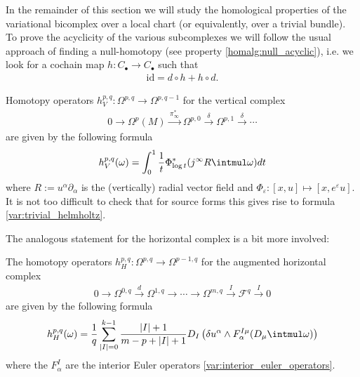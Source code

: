     In the remainder of this section we will study the homological properties of the variational bicomplex over a local chart (or equivalently, over a trivial bundle). To prove the acyclicity of the various subcomplexes we will follow the usual approach of finding a null-homotopy (see property \ref{homalg:null_acyclic}), i.e. we look for a cochain map $h:C_\bullet\rightarrow C_\bullet$ such that
    \begin{gather}
        \text{id} = d\circ h + h\circ d.
    \end{gather}

    \begin{property}
        Homotopy operators $h^{p,q}_V:\Omega^{p,q}\rightarrow\Omega^{p,q-1}$ for the vertical complex
        \begin{gather}
            0\longrightarrow\Omega^p(M)\xrightarrow{\,\pi_\infty^*\,}\Omega^{p,0}\xrightarrow{\ \delta\ }\Omega^{p,1}\xrightarrow{\ \delta\ }\cdots
        \end{gather}
        are given by the following formula
        \begin{gather}
            h^{p,q}_V(\omega) = \int_0^1\frac{1}{t}\Phi^*_{\log t}(j^\infty R\intmul\omega)dt
        \end{gather}
        where $R:=u^\alpha\partial_\alpha$ is the (vertically) radial vector field and $\Phi_\varepsilon:[x,u]\mapsto[x,e^\varepsilon u]$. It is not too difficult to check that for source forms this gives rise to formula \ref{var:trivial_helmholtz}.
    \end{property}
    The analogous statement for the horizontal complex is a bit more involved:
    \begin{property}
        The homotopy operators $h^{p,q}_H:\Omega^{p,q}\rightarrow\Omega^{p-1,q}$ for the augmented horizontal complex
        \begin{gather}
            0\longrightarrow\Omega^{0,q}\overset{d}{\longrightarrow}\Omega^{1,q}\longrightarrow\cdots\longrightarrow\Omega^{m,q}\overset{I}{\longrightarrow}\mathcal{F}^q\overset{I}{\longrightarrow}0
        \end{gather}
        are given by the following formula
        \begin{gather}
            h^{p,q}_H(\omega) = \frac{1}{q}\sum_{|I|=0}^{k-1}\frac{|I|+1}{m-p+|I|+1}D_I\left(\delta u^\alpha\wedge F^{I\mu}_\alpha(D_\mu\intmul\omega)\right)
        \end{gather}
        where the $F^I_\alpha$ are the interior Euler operators \ref{var:interior_euler_operators}.
    \end{property}

